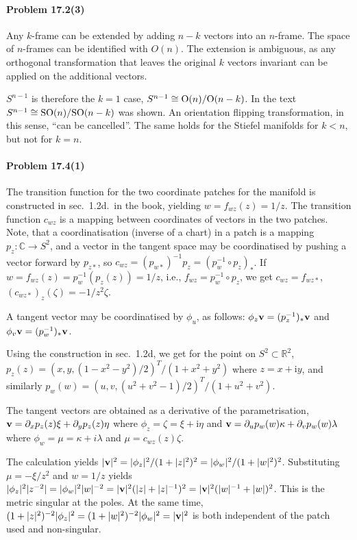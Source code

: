 \documentclass[a4paper,12pt]{article}
\def\imagi{\mathrm{i}}
\newcommand{\problem}[1]{\paragraph{Problem #1}}
\begin{document}

\problem{17.2(3)} Any $k$-frame can be extended by adding $n-k$ vectors into an $n$-frame. The space of $n$-frames can be identified with $O(n)$. The extension is ambiguous, as any orthogonal transformation that leaves the original $k$ vectors invariant can be applied on the additional vectors.

$S^{n-1}$ is therefore the $k=1$ case, $S^{n-1}\cong {\rm O}(n)/{\rm O}(n-k)$. In the text $S^{n-1}\cong {\rm SO}(n)/{\rm SO}(n-k)$ was shown. An orientation flipping transformation, in this sense, ``can be cancelled''. The same holds for the Stiefel manifolds for $k<n$, but not for $k=n$.


\problem{17.4(1)} The transition function for the two coordinate patches for the manifold is constructed in sec.\ 1.2d.\ in the book, yielding $w=f_{wz}(z) = 1/z$. The transition function $c_{wz}$ is a mapping between coordinates of vectors in the two patches. Note, that a coordinatisation (inverse of a chart) in a patch is a mapping $p_z: \mathbb{C}\to S^2$, and a vector in the tangent space may be coordinatised by pushing a vector forward by $p_{z*}$, so $c_{wz} = (p_{w*})^{-1} p_z = (p_w^{-1} \circ p_z)_*$. If $w=f_{wz}(z)=p_w^{-1}(p_z(z)) = 1/z$, i.e., $f_{wz}=p_w^{-1}\circ p_z$, we get $c_{wz}= f_{wz*}$, $(c_{wz*})_z(\zeta) = -1/z^2 \zeta$.


A tangent vector may be coordinatised by $\phi_u$, as follows: $\phi_z {\bf v} = (p_z^{-1})_* {\bf v}$ and $\phi_v {\bf v} = (p_w^{-1})_* {\bf v}$. 

Using the construction in sec.\ 1.2d, we get for the point on $S^2\subset \mathbb{R}^2$, $p_z(z) = (x, y, (1-x^2-y^2)/2)^T/(1+x^2+y^2)$ where $z=x+\imagi y$, and similarly $p_w(w) = (u, v, (u^2+v^2-1)/2)^T/(1+u^2+v^2)$.

The tangent vectors are obtained as a derivative of the parametrisation, ${\bf v} = \partial_x p_z(z) \xi + \partial_y p_z(z) \eta$ where $\phi_z = \zeta = \xi + \imagi \eta$ and ${\bf v} = \partial_u p_w(w) \kappa + \partial_v p_w(w) \lambda$ where $\phi_w =\mu = \kappa + i \lambda$ and $\mu = c_{wz}(z) \zeta$.

The calculation yields $|{\bf v}|^2 = |\phi_z|^2/(1+|z|^2)^2 = |\phi_w|^2/(1+|w|^2)^2$. Substituting $\mu = -\xi/z^2$ and $w=1/z$ yields $|\phi_z|^2 |z^{-2}| = |\phi_w|^2 |w|^{-2} = |{\bf v}|^2(|z| + |z|^{-1})^2 = |{\bf v}|^2 (|w|^{-1} + |w|)^2$. This is the metric singular at the poles. At the same time, $(1+|z|^2)^{-2}|\phi_z|^2 = (1+|w|^2)^{-2} |\phi_w|^2 = |{\bf v}|^2$ is both independent of the patch used and non-singular.
\end{document}
